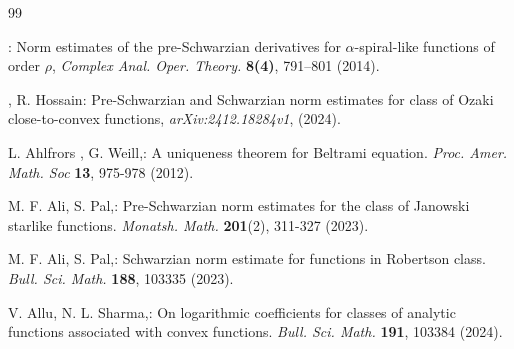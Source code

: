 \documentclass[a4paper,12pt]{amsart}
\theoremstyle{plain}
\theoremstyle{definition}
\theoremstyle{plain}
\begin{document}
\begin{thebibliography}{99}
	
	
: Norm estimates of the pre-Schwarzian derivatives for $\alpha$-spiral-like functions
of order $\rho$, \textit{Complex Anal. Oper. Theory.} \textbf{8(4)}, 791–801 (2014). 

, {\sc R. Hossain}: Pre-Schwarzian and Schwarzian norm estimates for class of Ozaki close-to-convex functions, \textit{arXiv:2412.18284v1}, (2024).  


 {\sc L. Ahlfrors }, {\sc G. Weill},: A uniqueness theorem for Beltrami equation. \textit{Proc. Amer. Math. Soc} \textbf{13}, 975-978 (2012). 



 {\sc M. F. Ali}, {\sc S. Pal},: Pre-Schwarzian norm estimates for the class of Janowski starlike functions.  \textit{Monatsh. Math.} \textbf{201}(2), 311-327 (2023). 


 {\sc M. F. Ali}, {\sc S. Pal},: Schwarzian norm estimate for functions in Robertson class.  \textit{Bull. Sci. Math.} \textbf{188}, 103335  (2023). 

 {\sc V.  Allu}, {\sc N. L. Sharma},: On logarithmic coefficients for classes of analytic functions associated with convex functions.  \textit{Bull. Sci. Math.} \textbf{191}, 103384  (2024). 





\end{thebibliography}
\end{document}
